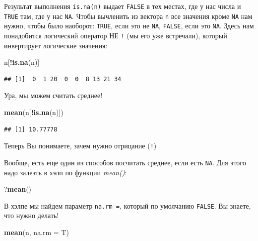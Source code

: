\documentclass[]{book}
\newenvironment{Shaded}{\begin{snugshade}}{\end{snugshade}}
\newcommand{\KeywordTok}[1]{\textcolor[rgb]{0.13,0.29,0.53}{\textbf{#1}}}
\newcommand{\DataTypeTok}[1]{\textcolor[rgb]{0.13,0.29,0.53}{#1}}
\newcommand{\OperatorTok}[1]{\textcolor[rgb]{0.81,0.36,0.00}{\textbf{#1}}}
\newcommand{\NormalTok}[1]{#1}
\begin{document}
Результат выполнения \texttt{is.na(n)} выдает \texttt{FALSE} в тех
местах, где у нас числа и \texttt{TRUE} там, где у нас \texttt{NA}.
Чтобы вычленить из вектора \texttt{n} все значения кроме \texttt{NA} нам
нужно, чтобы было наоборот: \texttt{TRUE}, если это не \texttt{NA},
\texttt{FALSE}, если это \texttt{NA}. Здесь нам понадобится логический
оператор НЕ \texttt{!} (мы его уже встречали), который инвертирует
логические значения:

\begin{Shaded}
\begin{Highlighting}[]
\NormalTok{n[}\OperatorTok{!}\KeywordTok{is.na}\NormalTok{(n)]}
\end{Highlighting}
\end{Shaded}

\begin{verbatim}
## [1]  0  1 20  0  0  8 13 21 34
\end{verbatim}

Ура, мы можем считать среднее!

\begin{Shaded}
\begin{Highlighting}[]
\KeywordTok{mean}\NormalTok{(n[}\OperatorTok{!}\KeywordTok{is.na}\NormalTok{(n)])}
\end{Highlighting}
\end{Shaded}

\begin{verbatim}
## [1] 10.77778
\end{verbatim}

Теперь Вы понимаете, зачем нужно отрицание (\texttt{!})

Вообще, есть еще один из способов посчитать среднее, если есть
\texttt{NA}. Для этого надо залезть в хэлп по функции \emph{mean()}:

\begin{Shaded}
\begin{Highlighting}[]
\NormalTok{?}\KeywordTok{mean}\NormalTok{()}
\end{Highlighting}
\end{Shaded}

В хэлпе мы найдем параметр \texttt{na.rm\ =}, который по умолчанию
\texttt{FALSE}. Вы знаете, что нужно делать!

\begin{Shaded}
\begin{Highlighting}[]
\KeywordTok{mean}\NormalTok{(n, }\DataTypeTok{na.rm =}\NormalTok{ T)}
\end{Highlighting}
\end{Shaded}
\end{document}
